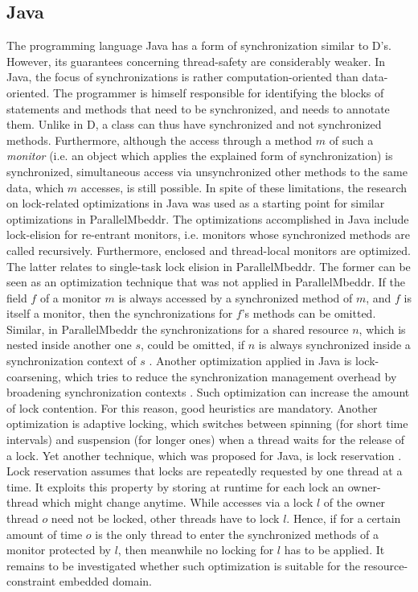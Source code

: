 \subsection{Java}
\label{java}
The programming language Java has a form of synchronization similar to D's. However, its guarantees concerning thread-safety are considerably weaker. In Java, the focus of synchronizations is rather computation-oriented than data-oriented. The programmer is himself responsible for identifying the blocks of statements and methods that need to be synchronized, and needs to annotate them. Unlike in D, a class can thus have synchronized and not synchronized methods. Furthermore, although the access through a method $m$ of such a \textit{monitor} (i.e. an object which applies the explained form of synchronization) is synchronized, simultaneous access via unsynchronized other methods to the same data, which $m$ accesses, is still possible. In spite of these limitations, the research on lock-related optimizations in Java was used as a starting point for similar optimizations in ParallelMbeddr. The optimizations accomplished in Java include lock-elision for re-entrant monitors, i.e. monitors whose synchronized methods are called recursively. Furthermore, enclosed and thread-local monitors are optimized. The latter relates to single-task lock elision in ParallelMbeddr. The former can be seen as an optimization technique that was not applied in ParallelMbeddr. If the field $f$ of a monitor $m$ is always accessed by a synchronized method of $m$, and $f$ is itself a monitor, then the synchronizations for $f$'s methods can be omitted. Similar, in ParallelMbeddr the synchronizations for a shared resource $n$, which is nested inside another one $s$, could be omitted, if $n$ is always synchronized inside a synchronization context of $s$ \cite{StaticAnalysesForJava}. Another optimization applied in Java is lock-coarsening, which tries to reduce the synchronization management overhead by broadening synchronization contexts \cite{JavaTheoryAndPractice}. Such optimization can increase the amount of lock contention. For this reason, good heuristics are mandatory. Another optimization is adaptive locking, which switches between spinning (for short time intervals) and suspension (for longer ones) when a thread waits for the release of a lock. Yet another technique, which was proposed for Java, is lock reservation \cite{LockReservation}. Lock reservation assumes that locks are repeatedly requested by one thread at a time. It exploits this property by storing at runtime for each lock an owner-thread which might change anytime. While accesses via a lock $l$ of the owner thread $o$ need not be locked, other threads have to lock $l$. Hence, if for a certain amount of time $o$ is the only thread to enter the synchronized methods of a monitor protected by $l$, then meanwhile no locking for $l$ has to be applied. It remains to be investigated whether such optimization is suitable for the resource-constraint embedded domain.

